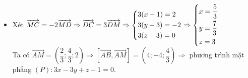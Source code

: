 \begin{ex}
{\begin{enumerate}
\begin{itemize}
Ta có $\vec{AM}=\left(\dfrac{4}{3};\dfrac{2}{3};2\right)\Rightarrow [\vec{AB},\vec{AM}]=\left(4;-4;-\dfrac{4}{3}\right)\Rightarrow$ phương trình mặt phẳng $(P):3x-3y-z+1=0$.
\item Xét $\protect\overrightarrow{MC}=-2\protect\overrightarrow{MD}\Rightarrow \protect\overrightarrow{DC}=3\protect\overrightarrow{DM}\Rightarrow \left\{\begin{aligned}&3(x-1)=2\\ &3(y-3)=-2\\ &3(z-3)=0\end{aligned}\right.\Rightarrow\left\{\begin{aligned}&x=\dfrac{5}{3}\\ &y=\dfrac{7}{3}\\ &z=3\end{aligned}\right.$\\
Ta có $\vec{AM}=\left(\dfrac{2}{3};\dfrac{4}{3};2\right)\Rightarrow [\vec{AB},\vec{AM}]=\left(4;-4;\dfrac{4}{3}\right)\Rightarrow$ phương trình mặt phẳng $(P):3x-3y+z-1=0$.
\end{itemize}
\end{enumerate}
}
\end{ex}
